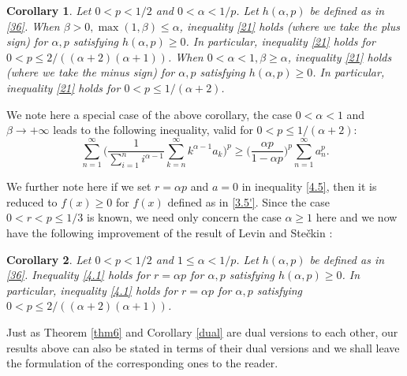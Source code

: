 \documentclass[11pt]{amsart}
\newtheorem{cor}{Corollary}[section]
\numberwithin{equation}{section}
\theoremstyle{definition}
\theoremstyle{remark}
\begin{document}
\begin{cor}
   Let $0<p<1/2$ and $0<  \alpha < 1/p$. Let $h(\alpha, p)$ be defined
   as in \eqref{36}. When $\beta>0, \max (1 , \beta) \leq \alpha$, inequality \eqref{21} holds (where we take the plus sign) for $\alpha, p$ satisfying $h(\alpha, p) \geq 0$. In
   particular,
   inequality \eqref{21} holds for $0<p \leq
   2/((\alpha+2)(\alpha+1))$. When $0<\alpha<1, \beta \geq \alpha$, inequality \eqref{21} holds (where we take the minus sign) for $\alpha, p$ satisfying $h(\alpha, p) \geq 0$. In
   particular,
   inequality \eqref{21} holds for $0<p \leq 1/(\alpha+2)$.
\end{cor}

    We note here a special case of the above corollary, the case $0<\alpha<1$ and $\beta \rightarrow +\infty$  leads to the
    following inequality, valid for $0< p \leq 1/(\alpha+2)$:
\begin{equation*}
   \sum^{\infty}_{n=1} \Big(\frac 1{ \sum^{n}_{i=1}i^{\alpha-1}}
\sum^{\infty}_{k=n}k^{\alpha-1}a_k \Big
  )^p \geq \Big ( \frac {\alpha p}{1-\alpha p} \Big )^p
  \sum^{\infty}_{n=1}a^p_n.
\end{equation*}

We further note here if we set $r=\alpha p$ and $a=0$ in
inequality \eqref{4.5}, then it is reduced to $f(x) \geq 0$ for
$f(x)$
    defined as in \eqref{3.5'}. Since the case $0<r<p \leq 1/3$
    is known, we need only concern the case $\alpha \geq 1$ here
    and we now have the following improvement of the result of Levin
    and Ste\v ckin \cite[Theorem 62]{L&S}:
\begin{cor}
   Let $0<p<1/2$ and $1 \leq  \alpha < 1/p$. Let $h(\alpha, p)$ be defined
   as in \eqref{36}. Inequality \eqref{4.1} holds for $r=\alpha p$
   for $\alpha, p$ satisfying $h(\alpha, p) \geq 0$. In
   particular, inequality \eqref{4.1} holds for $r=\alpha p$
   for $\alpha, p$ satisfying $0<p \leq
   2/((\alpha+2)(\alpha+1))$.
\end{cor}

    Just as Theorem \ref{thm6} and Corollary \ref{dual} are dual versions to each other, our results above can also be stated
    in terms of their dual versions and we shall leave the formulation of the corresponding
    ones to the reader.
\end{document}
